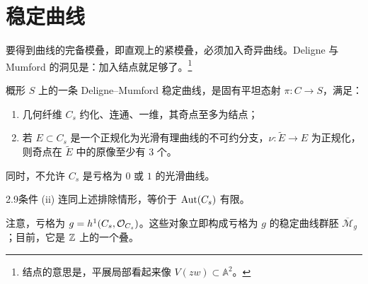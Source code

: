 \section{稳定曲线}
要得到曲线的完备模叠，即直观上的紧模叠，必须加入奇异曲线。Deligne 与 Mumford 的洞见是：加入结点就足够了。\footnote{结点的意思是，平展局部看起来像 $V(zw)\subset\mathbb A^2$。}
\begin{definition}\label{def:2.10}
概形 $S$ 上的一条 Deligne–Mumford 稳定曲线，是固有平坦态射 $\pi:C\to S$，满足：
\begin{enumerate}[label=(\roman*)]
\item 几何纤维 $C_s$ 约化、连通、一维，其奇点至多为结点；
\item 若 $E\subset C_s$ 是一个正规化为光滑有理曲线的不可约分支，$\nu:\widetilde E\to E$ 为正规化，则奇点在 $\widetilde E$ 中的原像至少有 $3$ 个。
\end{enumerate}
同时，不允许 $C_s$ 是亏格为 $0$ 或 $1$ 的光滑曲线。
\end{definition}
\begin{Note}{2.9}条件 (ii) 连同上述排除情形，等价于 $\operatorname{Aut}(C_s)$ 有限。\end{Note}
注意，亏格为 $g=h^1(C_s,\mathcal O_{C_s})$。这些对象立即构成亏格为 $g$ 的稳定曲线群胚 $\overline{\mathcal M}_g$；目前，它是 $\mathbb Z$ 上的一个叠。
